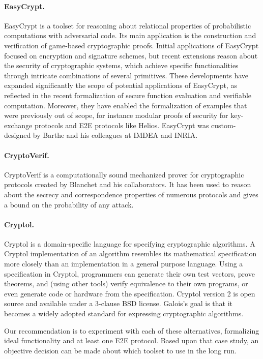 \paragraph{EasyCrypt.} EasyCrypt is a toolset for reasoning about
relational properties of probabilistic computations with adversarial
code. Its main application is the construction and verification of
game-based cryptographic proofs. Initial applications of EasyCrypt
focused on encryption and signature schemes, but recent extensions
reason about the security of cryptographic systems, which achieve
specific functionalities through intricate combinations of several
primitives. These developments have expanded significantly the scope
of potential applications of EasyCrypt, as reflected in the recent
formalization of secure function evaluation and verifiable
computation. Moreover, they have enabled the formalization of examples
that were previously out of scope, for instance modular proofs of
security for key-exchange protocols and E2E protocols like
Helios. EasyCrypt was custom-designed by Barthe and his colleagues at
IMDEA and INRIA.

\paragraph{CryptoVerif.} CryptoVerif is a computationally sound
mechanized prover for cryptographic protocols created by Blanchet and
his collaborators. It has been used to reason about the secrecy and
correspondence properties of numerous protocols and gives a bound on
the probability of any attack.

\paragraph{Cryptol.} Cryptol is a domain-specific language for
specifying cryptographic algorithms. A Cryptol implementation of an
algorithm resembles its mathematical specification more closely than
an implementation in a general purpose language. Using a specification
in Cryptol, programmers can generate their own test vectors, prove
theorems, and (using other tools) verify equivalence to their own
programs, or even generate code or hardware from the specification.
Cryptol version 2 is open source and available under a 3-clause BSD
license. Galois's goal is that it becomes a widely adopted standard
for expressing cryptographic algorithms.

Our recommendation is to experiment with each of these alternatives,
formalizing ideal functionality and at least one E2E protocol. Based
upon that case study, an objective decision can be made about which
toolset to use in the long run. 


